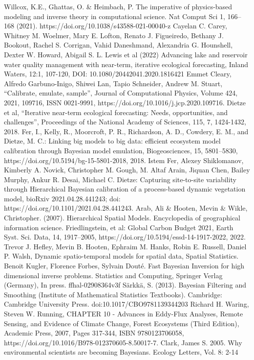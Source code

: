 \documentclass[12pt]{article}
\begin{document}
\begin{thebibliography}{20}
 Willcox, K.E., Ghattas, O. \& Heimbach, P. The imperative of physics-based modeling and inverse theory in computational science. Nat Comput Sci 1, 166–168 (2021). https://doi.org/10.1038/s43588-021-00040-z
 Cayelan C. Carey, Whitney M. Woelmer, Mary E. Lofton, Renato J. Figueiredo, Bethany J. Bookout, Rachel S. Corrigan, Vahid Daneshmand, Alexandria G. Hounshell, Dexter W. Howard, Abigail S. L. Lewis et al (2022) Advancing lake and reservoir water quality management with near-term, iterative ecological forecasting, Inland Waters, 12:1, 107-120, DOI: 10.1080/20442041.2020.1816421
 Emmet Cleary, Alfredo Garbuno-Inigo, Shiwei Lan, Tapio Schneider, Andrew M. Stuart, “Calibrate, emulate, sample”, Journal of Computational Physics, Volume 424, 2021, 109716, ISSN 0021-9991, https://doi.org/10.1016/j.jcp.2020.109716.
 Dietze et al, “Iterative near-term ecological forecasting: Needs, opportunities, and challenges”, Proceedings of the National Academy of Sciences, 115, 7, 1424-1432, 2018.
 Fer, I., Kelly, R., Moorcroft, P. R., Richardson, A. D., Cowdery, E. M., and Dietze, M. C.: Linking big models to big data: efficient ecosystem model calibration through Bayesian model emulation, Biogeosciences, 15, 5801–5830, https://doi.org/10.5194/bg-15-5801-2018, 2018.
 Istem Fer, Alexey Shiklomanov, Kimberly A. Novick, Christopher M. Gough, M. Altaf Arain, Jiquan Chen, Bailey Murphy, Ankur R. Desai, Michael C. Dietze: Capturing site-to-site variability through Hierarchical Bayesian calibration of a process-based dynamic vegetation model, bioRxiv 2021.04.28.441243; doi: https://doi.org/10.1101/2021.04.28.441243. 
 Arab, Ali \& Hooten, Mevin \& Wikle, Christopher. (2007). Hierarchical Spatial Models. Encyclopedia of geographical information science.
 Friedlingstein, et al: Global Carbon Budget 2021, Earth Syst. Sci. Data, 14, 1917–2005, https://doi.org/10.5194/essd-14-1917-2022, 2022.
 Trevor J. Hefley, Mevin B. Hooten, Ephraim M. Hanks, Robin E. Russell, Daniel P. Walsh, Dynamic spatio-temporal models for spatial data, Spatial Statistics.
 Benoit Kugler, Florence Forbes, Sylvain Douté. Fast Bayesian Inversion for high dimensional inverse problems. Statistics and Computing, Springer Verlag (Germany), In press. ffhal-02908364v3f
 Särkkä, S. (2013). Bayesian Filtering and Smoothing (Institute of Mathematical Statistics Textbooks). Cambridge: Cambridge University Press. doi:10.1017/CBO9781139344203
 Richard H. Waring, Steven W. Running, CHAPTER 10 - Advances in Eddy-Flux Analyses, Remote Sensing, and Evidence of Climate Change, Forest Ecosystems (Third Edition), Academic Press, 2007, Pages 317-344, ISBN 9780123706058, https://doi.org/10.1016/B978-012370605-8.50017-7.
 Clark, James S. 2005. Why environmental scientists are becoming Bayesians. Ecology Letters, Vol. 8: 2-14

\end{thebibliography}
\end{document}
